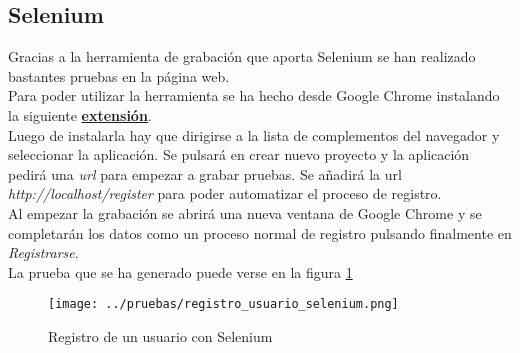 \subsection{Selenium}
Gracias a la herramienta de grabación que aporta Selenium \cite{selenium-testing} se han realizado bastantes pruebas en la página web.
\\Para poder utilizar la herramienta se ha hecho desde Google Chrome instalando la siguiente \href{https://chrome.google.com/webstore/detail/selenium-ide/mooikfkahbdckldjjndioackbalphokd}{\textbf{extensión}}.
\\Luego de instalarla hay que dirigirse a la lista de complementos del navegador y seleccionar la aplicación. Se pulsará en crear nuevo proyecto y la aplicación pedirá una \textit{url} para empezar a grabar pruebas. Se añadirá la url \textit{http://localhost/register} para poder automatizar el proceso de registro.
\\Al empezar la grabación se abrirá una nueva ventana de Google Chrome y se completarán los datos como un proceso normal de registro pulsando finalmente en \textit{Registrarse}.
\\La prueba que se ha generado puede verse en la figura \ref{fig:registro-usuario-selenium}
\begin{figure}[ht]
    \centering
    \texttt{[image: ../pruebas/registro\_usuario\_selenium.png]}
    \caption{Registro de un usuario con Selenium}\label{fig:registro-usuario-selenium}
\end{figure}
